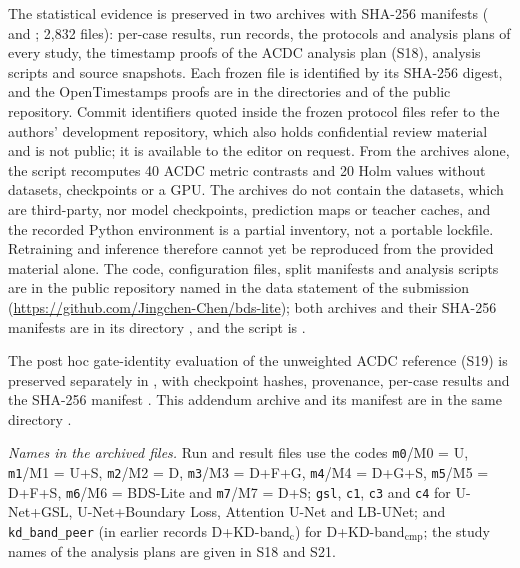 \documentclass[10pt]{article}
\makeatletter
\renewcommand\paragraph{\@startsection{paragraph}{4}{\z@}{1.6ex \@plus .5ex \@minus .2ex}{-1em}{\normalfont\normalsize\bfseries}}
\makeatother
\begin{document}
\paragraph{What is provided, and what is not.} The statistical evidence is preserved in two archives with SHA-256 manifests ( and ; 2,832 files): per-case results, run records, the protocols and analysis plans of every study, the timestamp proofs of the ACDC analysis plan (S18), analysis scripts and source snapshots. Each frozen file is identified by its SHA-256 digest, and the OpenTimestamps proofs are in the directories  and  of the public repository. Commit identifiers quoted inside the frozen protocol files refer to the authors' development repository, which also holds confidential review material and is not public; it is available to the editor on request. From the archives alone, the script  recomputes 40 ACDC metric contrasts and 20 Holm values without datasets, checkpoints or a GPU. The archives do not contain the datasets, which are third-party, nor model checkpoints, prediction maps or teacher caches, and the recorded Python environment is a partial inventory, not a portable lockfile. Retraining and inference therefore cannot yet be reproduced from the provided material alone. The code, configuration files, split manifests and analysis scripts are in the public repository named in the data statement of the submission (\url{https://github.com/Jingchen-Chen/bds-lite}); both archives and their SHA-256 manifests are in its directory , and the script is .

The post hoc gate-identity evaluation of the unweighted ACDC reference (S19) is preserved separately in , with checkpoint hashes, provenance, per-case results and the SHA-256 manifest . This addendum archive and its manifest are in the same directory .

\emph{Names in the archived files.} Run and result files use the codes \texttt{m0}/M0 = U, \texttt{m1}/M1 = U+S, \texttt{m2}/M2 = D, \texttt{m3}/M3 = D+F+G, \texttt{m4}/M4 = D+G+S, \texttt{m5}/M5 = D+F+S, \texttt{m6}/M6 = BDS-Lite and \texttt{m7}/M7 = D+S; \texttt{gsl}, \texttt{c1}, \texttt{c3} and \texttt{c4} for U-Net+GSL, U-Net+Boundary Loss, Attention U-Net and LB-UNet; and \texttt{kd\_band\_peer} (in earlier records D+KD-band$_{\mathrm{c}}$) for D+KD-band$_{\mathrm{cmp}}$; the study names of the analysis plans are given in S18 and S21.
\end{document}
